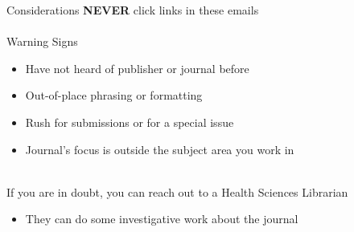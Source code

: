 \documentclass[aspectratio=169]{beamer}
\begin{document}
\begin{frame}{Considerations}
	\textbf{NEVER} click links in these emails
	~\\~\\
	Warning Signs
	\begin{itemize}
		\item Have not heard of publisher or journal before
		\item Out-of-place phrasing or formatting
		\item Rush for submissions or for a special issue
		\item Journal's focus is outside the subject area you work in
	\end{itemize}
	~\\
	If you are in doubt, you can reach out to a Health Sciences Librarian
	\begin{itemize}
		\item They can do some investigative work about the journal
	\end{itemize}
\end{frame}
\end{document}
